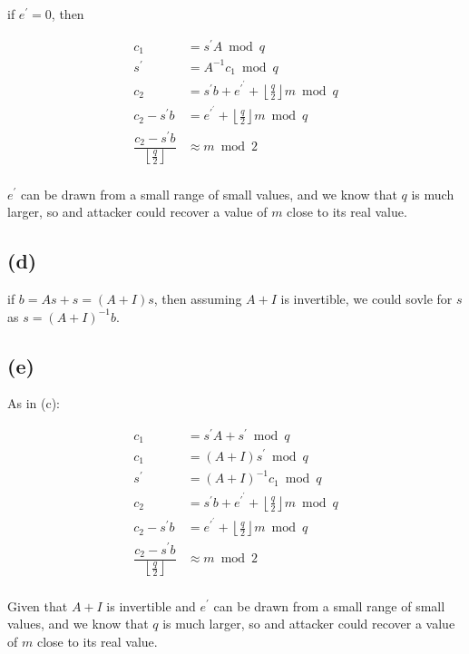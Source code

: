 \documentclass[11pt]{article}
\begin{document}
if $e^\prime = 0$, then

\begin{align*}
  c_1 &= s^\prime A \bmod q \\
  s^\prime &= A^{-1} c_1  \bmod q \\
  c_2 &= s^\prime b + e^\prime^\prime + \left\lfloor\frac{q}{2}\right\rfloor m \bmod q \\
  c_2 - s^\prime b &= e^\prime^\prime + \left\lfloor\frac{q}{2}\right\rfloor m \bmod q \\
  \dfrac{c_2 - s^\prime b}{\left\lfloor\frac{q}{2}\right\rfloor} &\approx  m \bmod 2 \\
\end{align*}


$e^\prime$ can be drawn from a small range of small values, and we know that $q$ is much larger, so and attacker could recover a value of $m$ close to its real value.

\subsection{(d)}

if $b = As + s = (A + I)s$, then assuming $A + I$ is invertible, we could sovle for $s$ as $s = (A + I)^{-1}b$.

\subsection{(e)}

As in (c):

\begin{align*}
  c_1 &= s^\prime A + s^\prime \bmod q \\
  c_1 &= (A + I)s^\prime \bmod q \\
  s^\prime &= (A + I)^{-1}c_1 \bmod q \\
  c_2 &= s^\prime b + e^\prime^\prime + \left\lfloor\frac{q}{2}\right\rfloor m \bmod q \\
  c_2 - s^\prime b &= e^\prime^\prime + \left\lfloor\frac{q}{2}\right\rfloor m \bmod q \\
  \dfrac{c_2 - s^\prime b}{\left\lfloor\frac{q}{2}\right\rfloor} &\approx  m \bmod 2 \\
\end{align*}


Given that $A + I$ is invertible and $e^\prime$ can be drawn from a small range of small values, and we know that $q$ is much larger, so and attacker could recover a value of $m$ close to its real value.
\end{document}
